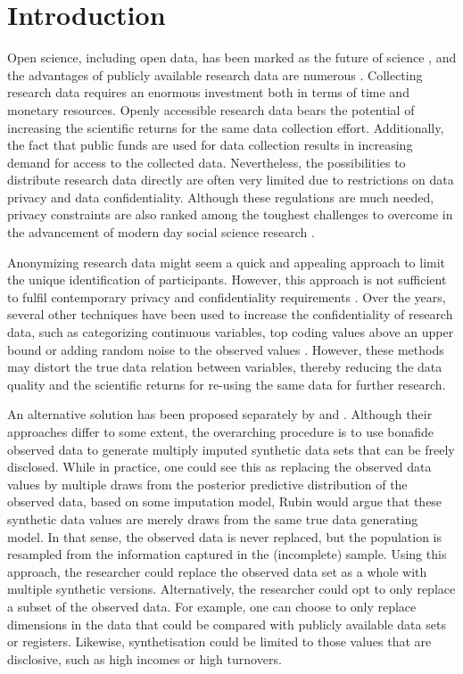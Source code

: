 \documentclass[psych,article,submit,moreauthors,pdftex]{mdpi}
\begin{document}

\hypertarget{introduction}{%
\section{Introduction}\label{introduction}}

Open science, including open data, has been marked as the future of
science \citep{gewin_data_2016}, and the advantages of publicly
available research data are numerous
\citep{molloy_open_2011, walport_brest_sharing_2011}. Collecting
research data requires an enormous investment both in terms of time and
monetary resources. Openly accessible research data bears the potential
of increasing the scientific returns for the same data collection
effort. Additionally, the fact that public funds are used for data
collection results in increasing demand for access to the collected
data. Nevertheless, the possibilities to distribute research data
directly are often very limited due to restrictions on data privacy and
data confidentiality. Although these regulations are much needed,
privacy constraints are also ranked among the toughest challenges to
overcome in the advancement of modern day social science research
\citep{lazer_life_2009}.

Anonymizing research data might seem a quick and appealing approach to
limit the unique identification of participants. However, this approach
is not sufficient to fulfil contemporary privacy and confidentiality
requirements \citep{ohm_broken_2009, national_putting_2007}. Over the
years, several other techniques have been used to increase the
confidentiality of research data, such as categorizing continuous
variables, top coding values above an upper bound or adding random noise
to the observed values \citep{drechsler_synthetic_2011}. However, these
methods may distort the true data relation between variables, thereby
reducing the data quality and the scientific returns for re-using the
same data for further research.

An alternative solution has been proposed separately by
\citet{rubin_statistical_disclosure_1993} and
\citet{little_statistical_1993}. Although their approaches differ to
some extent, the overarching procedure is to use bonafide observed data
to generate multiply imputed synthetic data sets that can be freely
disclosed. While in practice, one could see this as replacing the
observed data values by multiple draws from the posterior predictive
distribution of the observed data, based on some imputation model, Rubin
would argue that these synthetic data values are merely draws from the
same true data generating model. In that sense, the observed data is
never replaced, but the population is resampled from the information
captured in the (incomplete) sample. Using this approach, the researcher
could replace the observed data set as a whole with multiple synthetic
versions. Alternatively, the researcher could opt to only replace a
subset of the observed data. For example, one can choose to only replace
dimensions in the data that could be compared with publicly available
data sets or registers. Likewise, synthetisation could be limited to
those values that are disclosive, such as high incomes or high
turnovers.
\end{document}
